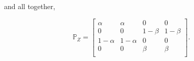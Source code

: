 \documentclass[12pt]{article}
\newcommand{\om}[0] { \omega }
\newcommand{\Om}[0] { \Omega }
\newcommand{ \cf }[1] { \mathbf{1}_{#1} }
\begin{document}
\noindent
and all together,

$$
\mathbb{P}_Z = \left[ \begin{array}{cccc} 
\alpha  & \alpha  & 0 & 0 \\
0 & 0 & 1-\beta  & 1-\beta  \\
1-\alpha & 1-\alpha & 0 & 0 \\
0 & 0 & \beta & \beta \\
\end{array} \right].
$$








\end{document}
